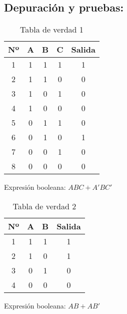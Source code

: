 \subsection{\textbf{Depuración y pruebas:}}

\begin{table}[h]
\centering
\begin{tabular}{|c|c|c|c|c|}
\hline
\textbf{Nº} & \textbf{A} & \textbf{B} & \textbf{C} & \textbf{Salida} \\
\hline
1 & 1 & 1 & 1 & 1 \\
2 & 1 & 1 & 0 & 0 \\
3 & 1 & 0 & 1 & 0 \\
4 & 1 & 0 & 0 & 0 \\
5 & 0 & 1 & 1 & 0 \\
6 & 0 & 1 & 0 & 1 \\
7 & 0 & 0 & 1 & 0 \\
8 & 0 & 0 & 0 & 0 \\
\hline
\end{tabular}
\caption{Tabla de verdad 1}
Expresión booleana: $ABC + A'BC'$
\end{table}
\newpage
\begin{table}[h]
\centering
\begin{tabular}{|c|c|c|c|}
\hline
\textbf{Nº} & \textbf{A} & \textbf{B} & \textbf{Salida} \\
\hline
1 & 1 & 1 & 1 \\
2 & 1 & 0 & 1 \\
3 & 0 & 1 & 0 \\
4 & 0 & 0 & 0 \\
\hline
\end{tabular}
\caption{Tabla de verdad 2}
Expresión booleana: $AB + AB'$
\end{table}
